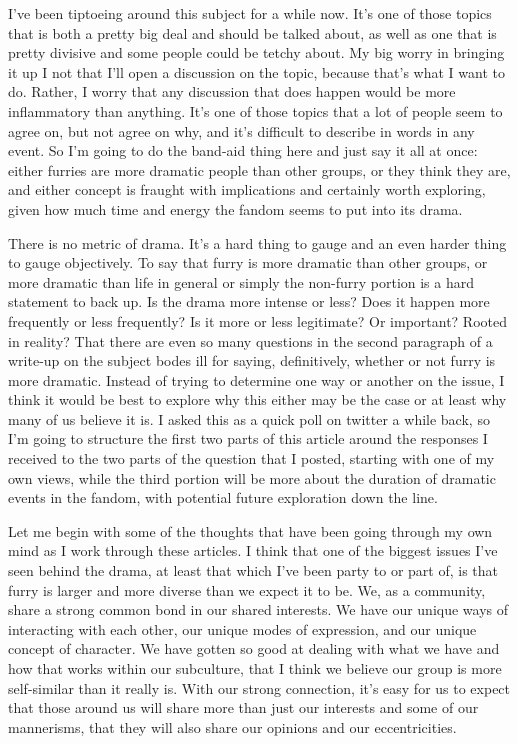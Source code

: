 
I've been tiptoeing around this subject for a while now. It's one of those topics that is both a pretty big deal and should be talked about, as well as one that is pretty divisive and some people could be tetchy about. My big worry in bringing it up I not that I'll open a discussion on the topic, because that's what I want to do. Rather, I worry that any discussion that does happen would be more inflammatory than anything. It's one of those topics that a lot of people seem to agree on, but not agree on why, and it's difficult to describe in words in any event. So I'm going to do the band-aid thing here and just say it all at once: either furries are more dramatic people than other groups, or they think they are, and either concept is fraught with implications and certainly worth exploring, given how much time and energy the fandom seems to put into its drama.

There is no metric of drama. It's a hard thing to gauge and an even harder thing to gauge objectively. To say that furry is more dramatic than other groups, or more dramatic than life in general or simply the non-furry portion is a hard statement to back up. Is the drama more intense or less? Does it happen more frequently or less frequently? Is it more or less legitimate? Or important? Rooted in reality? That there are even so many questions in the second paragraph of a write-up on the subject bodes ill for saying, definitively, whether or not furry is more dramatic. Instead of trying to determine one way or another on the issue, I think it would be best to explore why this either may be the case or at least why many of us believe it is. I asked this as a quick poll on twitter a while back, so I'm going to structure the first two parts of this article around the responses I received to the two parts of the question that I posted, starting with one of my own views, while the third portion will be more about the duration of dramatic events in the fandom, with potential future exploration down the line.

Let me begin with some of the thoughts that have been going through my own mind as I work through these articles. I think that one of the biggest issues I've seen behind the drama, at least that which I've been party to or part of, is that furry is larger and more diverse than we expect it to be. We, as a community, share a strong common bond in our shared interests. We have our unique ways of interacting with each other, our unique modes of expression, and our unique concept of character. We have gotten so good at dealing with what we have and how that works within our subculture, that I think we believe our group is more self-similar than it really is. With our strong connection, it's easy for us to expect that those around us will share more than just our interests and some of our mannerisms, that they will also share our opinions and our eccentricities.

